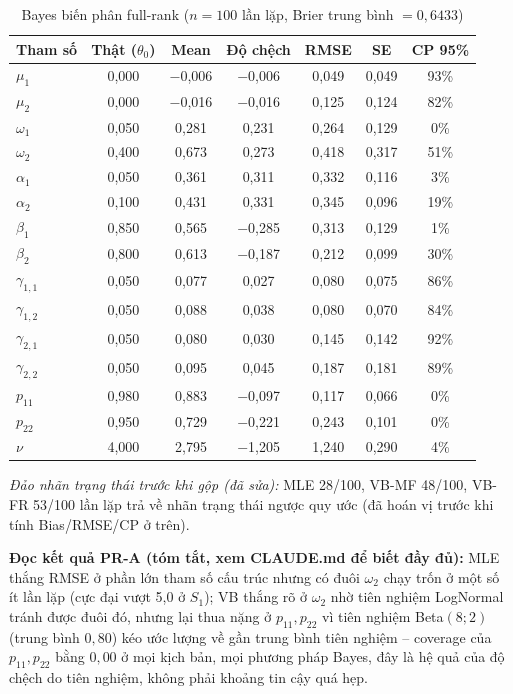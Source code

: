 \documentclass[11pt,a4paper]{article}
\begin{document}
\begin{table}[H]\centering\scriptsize
\caption{Bayes biến phân full-rank ($n=100$ lần lặp, Brier trung bình $=0,6433$)}
\begin{tabularx}{\textwidth}{l C C C C C C}
\toprule
\textbf{Tham số} & \textbf{Thật ($\theta_0$)} & \textbf{Mean} & \textbf{Độ chệch} & \textbf{RMSE} & \textbf{SE} & \textbf{CP 95\%} \\
\midrule
$\mu_1$ & 0,000 & $-$0,006 & $-$0,006 & 0,049 & 0,049 & 93\% \\
$\mu_2$ & 0,000 & $-$0,016 & $-$0,016 & 0,125 & 0,124 & 82\% \\
$\omega_1$ & 0,050 & 0,281 & 0,231 & 0,264 & 0,129 & 0\% \\
$\omega_2$ & 0,400 & 0,673 & 0,273 & 0,418 & 0,317 & 51\% \\
$\alpha_1$ & 0,050 & 0,361 & 0,311 & 0,332 & 0,116 & 3\% \\
$\alpha_2$ & 0,100 & 0,431 & 0,331 & 0,345 & 0,096 & 19\% \\
$\beta_1$ & 0,850 & 0,565 & $-$0,285 & 0,313 & 0,129 & 1\% \\
$\beta_2$ & 0,800 & 0,613 & $-$0,187 & 0,212 & 0,099 & 30\% \\
$\gamma_{1,1}$ & 0,050 & 0,077 & 0,027 & 0,080 & 0,075 & 86\% \\
$\gamma_{1,2}$ & 0,050 & 0,088 & 0,038 & 0,080 & 0,070 & 84\% \\
$\gamma_{2,1}$ & 0,050 & 0,080 & 0,030 & 0,145 & 0,142 & 92\% \\
$\gamma_{2,2}$ & 0,050 & 0,095 & 0,045 & 0,187 & 0,181 & 89\% \\
$p_{11}$ & 0,980 & 0,883 & $-$0,097 & 0,117 & 0,066 & 0\% \\
$p_{22}$ & 0,950 & 0,729 & $-$0,221 & 0,243 & 0,101 & 0\% \\
$\nu$ & 4,000 & 2,795 & $-$1,205 & 1,240 & 0,290 & 4\% \\
\bottomrule
\end{tabularx}
\end{table}

\emph{Đảo nhãn trạng thái trước khi gộp (đã sửa):} MLE 28/100, VB-MF 48/100, VB-FR 53/100 lần lặp trả về nhãn trạng thái ngược quy ước (đã hoán vị trước khi tính Bias/RMSE/CP ở trên).
\bigskip

\textbf{Đọc kết quả PR-A (tóm tắt, xem CLAUDE.md để biết đầy đủ):} MLE thắng RMSE
ở phần lớn tham số cấu trúc nhưng có đuôi $\omega_2$ chạy trốn ở một số ít lần lặp
(cực đại vượt 5,0 ở $S_1$); VB thắng rõ ở $\omega_2$ nhờ tiên nghiệm LogNormal
tránh được đuôi đó, nhưng lại thua nặng ở $p_{11},p_{22}$ vì tiên nghiệm
Beta$(8;2)$ (trung bình $0{,}80$) kéo ước lượng về gần trung bình tiên nghiệm --
coverage của $p_{11},p_{22}$ bằng $0{,}00$ ở mọi kịch bản, mọi phương pháp Bayes,
đây là hệ quả của độ chệch do tiên nghiệm, không phải khoảng tin cậy quá hẹp.
\end{document}
